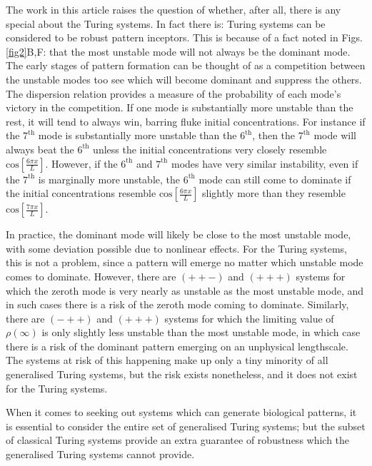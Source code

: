The work in this article raises the question of whether, after all, there is any special about the Turing systems. In fact there is: Turing systems can be considered to be robust pattern inceptors. This is because of a fact noted in Figs. \ref{fig2}B,F: that the most unstable mode will not always be the dominant mode. The early stages of pattern formation can be thought of as a competition between the unstable modes too see which will become dominant and suppress the others. The dispersion relation provides a measure of the probability of each mode's victory in the competition. If one mode is substantially more unstable than the rest, it will tend to always win, barring fluke initial concentrations. For instance if the $7^\text{th}$ mode is substantially more unstable than the $6^\text{th}$, then the $7^\text{th}$ mode will always beat the $6^\text{th}$ unless the initial concentrations very closely resemble $\text{cos}\left[\frac{6\pi x}{L}\right]$. However, if the $6^\text{th}$ and $7^\text{th}$ modes have very similar instability, even if the $7^\text{th}$ is marginally more unstable, the $6^\text{th}$ mode can still come to dominate if the initial concentrations resemble $\text{cos}\left[\frac{6\pi x}{L}\right]$ slightly more than they resemble $\text{cos}\left[\frac{7\pi x}{L}\right]$. 

In practice, the dominant mode will likely be close to the most unstable mode, with some deviation possible due to nonlinear effects. For the Turing systems, this is not a problem, since a pattern will emerge no matter which unstable mode comes to dominate. However, there are $(++-)$ and $(+++)$ systems for which the zeroth mode is very nearly as unstable as the most unstable mode, and in such cases there is a risk of the zeroth mode coming to dominate. Similarly, there are $(-++)$ and $(+++)$ systems for which the limiting value of $\rho(\infty)$ is only slightly less unstable than the most unstable mode, in which case there is a risk of the dominant pattern emerging on an unphysical lengthscale. The systems at risk of this happening make up only a tiny minority of all generalised Turing systems, but the risk exists nonetheless, and it does not exist for the Turing systems.

When it comes to seeking out systems which can generate biological patterns, it is essential to consider the entire set of generalised Turing systems; but the subset of classical Turing systems provide an extra guarantee of robustness which the generalised Turing systems cannot provide.
